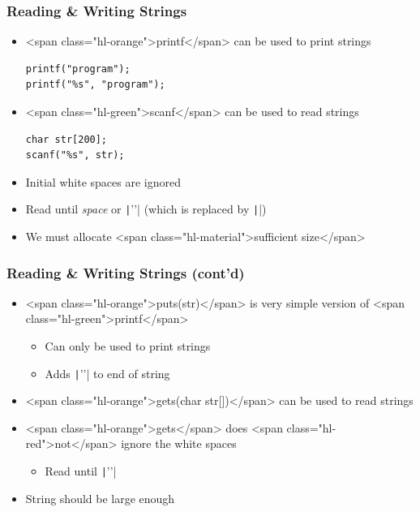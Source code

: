 \documentclass{../c-lecture}
\begin{document}
\begin{frame}[fragile]
  \frametitle{Reading \& Writing Strings}
  \begin{itemize}
    \item <span class="hl-orange">printf</span> can be used to print strings
    \begin{verbatim}
printf("program");
printf("%s", "program");
    \end{verbatim}
  \end{itemize}
  \begin{itemize}
    \item <span class="hl-green">scanf</span> can be used to read strings
    \begin{verbatim}
char str[200];
scanf("%s", str);
    \end{verbatim}
    \item Initial white spaces are ignored
    \item
      Read until \textit{\color{Orange} space} or
      \texttt|'\n'| (which is replaced by \texttt|\0|)

    \item We must allocate <span class="hl-material">sufficient size</span>
  \end{itemize}
\end{frame}

\begin{frame}
  \frametitle{Reading \& Writing Strings (cont’d)}
  \begin{itemize}
    \item
      <span class="hl-orange">puts(str)</span> is very simple version of
      <span class="hl-green">printf</span>

    \begin{itemize}
      \item Can only be used to print strings
      \item Adds \texttt|'\n'| to end of string
    \end{itemize}
    \item
      <span class="hl-orange">gets(char str[])</span> can be used to read
      strings

    \item
      <span class="hl-orange">gets</span> does
      <span class="hl-red">not</span> ignore the white spaces

    \begin{itemize}
      \item Read until \texttt|'\n'|
    \end{itemize}
    \item String should be large enough
  \end{itemize}
\end{frame}
\end{document}

